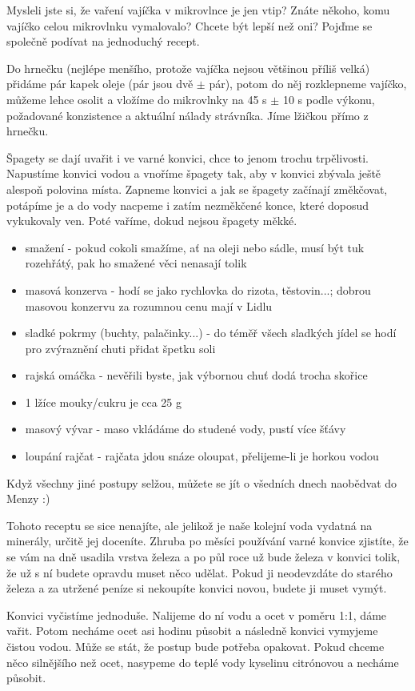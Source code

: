 Mysleli jste si, že vaření vajíčka v mikrovlnce je jen vtip? Znáte někoho, komu
vajíčko celou mikrovlnku vymalovalo? Chcete být lepší než oni? Pojďme se
společně podívat na jednoduchý recept.

Do hrnečku (nejlépe menšího, protože vajíčka nejsou většinou příliš velká)
přidáme pár kapek oleje (pár jsou dvě $\pm$ pár), potom do něj rozklepneme
vajíčko, můžeme lehce osolit a vložíme do mikrovlnky na 45 s $\pm$ 10 s podle
výkonu, požadované konzistence a aktuální nálady strávníka. Jíme lžičkou přímo z
hrnečku.


Špagety se dají uvařit i ve varné konvici, chce to jenom trochu trpělivosti.
Napustíme konvici vodou a vnoříme špagety tak, aby v konvici zbývala ještě
alespoň polovina místa. Zapneme konvici a jak se špagety začínají změkčovat,
potápíme je a do vody nacpeme i zatím nezměkčené konce, které doposud vykukovaly
ven. Poté vaříme, dokud nejsou špagety měkké.


\begin{itemize}
\item smažení - pokud cokoli smažíme, ať na oleji nebo sádle, musí být tuk
rozehřátý, pak ho smažené věci nenasají tolik
\item masová konzerva - hodí se jako rychlovka do rizota, těstovin...; dobrou
masovou konzervu za rozumnou cenu mají v Lidlu
\item sladké pokrmy (buchty, palačinky...) - do téměř všech sladkých jídel se
hodí pro zvýraznění chuti přidat špetku soli
\item rajská omáčka - nevěřili byste, jak výbornou chuť dodá trocha skořice
\item 1 lžíce mouky/cukru je cca 25 g
\item masový vývar - maso vkládáme do studené vody, pustí více šťávy
\item loupání rajčat - rajčata jdou snáze oloupat, přelijeme-li je horkou vodou
\end{itemize}

Když všechny jiné postupy selžou, můžete se jít o všedních dnech naobědvat do
Menzy :)

Tohoto receptu se sice nenajíte, ale jelikož je naše kolejní voda vydatná na
minerály, určitě jej doceníte. Zhruba po měsíci používání varné konvice
zjistíte, že se vám na dně usadila vrstva železa a po půl roce už bude železa v
konvici tolik, že už s ní budete opravdu muset něco udělat. Pokud ji neodevzdáte
do starého železa a za utržené peníze si nekoupíte konvici novou, budete ji
muset vymýt.

Konvici vyčistíme jednoduše. Nalijeme do ní vodu a ocet v poměru 1:1, dáme
vařit. Potom necháme ocet asi hodinu působit a následně konvici vymyjeme čistou
vodou. Může se stát, že postup bude potřeba opakovat. Pokud chceme něco
silnějšího než ocet, nasypeme do teplé vody kyselinu citrónovou a necháme
působit.